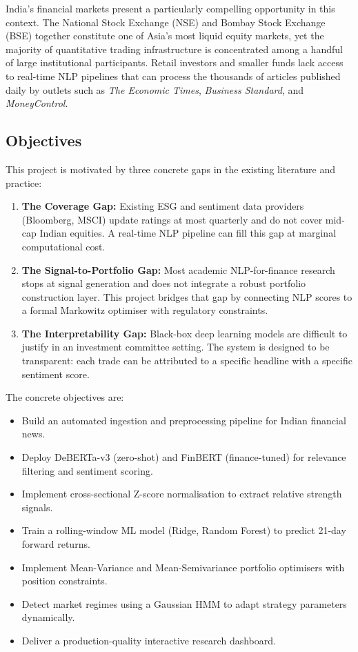 \documentclass[12pt, a4paper]{article}
\begin{document}
India's financial markets present a particularly compelling opportunity in this context. The National Stock Exchange (NSE) and Bombay Stock Exchange (BSE) together constitute one of Asia's most liquid equity markets, yet the majority of quantitative trading infrastructure is concentrated among a handful of large institutional participants. Retail investors and smaller funds lack access to real-time NLP pipelines that can process the thousands of articles published daily by outlets such as \textit{The Economic Times}, \textit{Business Standard}, and \textit{MoneyControl}.

\subsection{Objectives}

This project is motivated by three concrete gaps in the existing literature and practice:

\begin{enumerate}[leftmargin=2em]
    \item \textbf{The Coverage Gap:} Existing ESG and sentiment data providers (Bloomberg, MSCI) update ratings at most quarterly and do not cover mid-cap Indian equities. A real-time NLP pipeline can fill this gap at marginal computational cost.
    \item \textbf{The Signal-to-Portfolio Gap:} Most academic NLP-for-finance research stops at signal generation and does not integrate a robust portfolio construction layer. This project bridges that gap by connecting NLP scores to a formal Markowitz optimiser with regulatory constraints.
    \item \textbf{The Interpretability Gap:} Black-box deep learning models are difficult to justify in an investment committee setting. The system is designed to be transparent: each trade can be attributed to a specific headline with a specific sentiment score.
\end{enumerate}

The concrete objectives are:

\begin{itemize}[leftmargin=2em]
    \item Build an automated ingestion and preprocessing pipeline for Indian financial news.
    \item Deploy DeBERTa-v3 (zero-shot) and FinBERT (finance-tuned) for relevance filtering and sentiment scoring.
    \item Implement cross-sectional Z-score normalisation to extract relative strength signals.
    \item Train a rolling-window ML model (Ridge, Random Forest) to predict 21-day forward returns.
    \item Implement Mean-Variance and Mean-Semivariance portfolio optimisers with position constraints.
    \item Detect market regimes using a Gaussian HMM to adapt strategy parameters dynamically.
    \item Deliver a production-quality interactive research dashboard.
\end{itemize}
\end{document}
